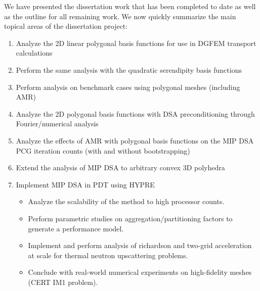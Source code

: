 \documentclass[11pt]{article}
\begin{document}
We have presented the dissertation work that has been completed to date as well as the outline for all remaining work. We now quickly summarize the main topical areas of the dissertation project:

\begin{enumerate}
	\item Analyze the 2D linear polygonal basis functions for use in DGFEM transport calculations
	\item Perform the same analysis with the quadratic serendipity basis functions
	\item Perform analysis on benchmark cases using polygonal meshes (including AMR)
	\item Analyze the 2D polygonal basis functions with DSA preconditioning through Fourier/numerical analysis
	\item Analyze the effects of AMR with polygonal basis functions on the MIP DSA PCG iteration counts (with and without bootstrapping)
	\item Extend the analysis of MIP DSA to arbitrary convex 3D polyhedra
	\item Implement MIP DSA in PDT using HYPRE
	\begin{itemize}
		\item Analyze the scalability of the method to high processor counts.
		\item Perform parametric studies on aggregation/partitioning factors to generate a performance model.
		\item Implement and perform analysis of richardson and two-grid acceleration at scale for thermal neutron upscattering problems.
		\item Conclude with real-world numerical experiments on high-fidelity meshes (CERT IM1 problem).
	\end{itemize}
\end{enumerate}



\end{document}
